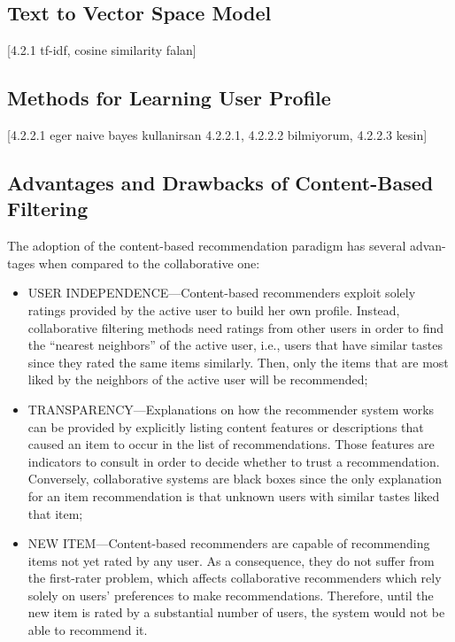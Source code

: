 \subsection{Text to Vector Space Model}

[4.2.1 tf-idf, cosine similarity falan]

\subsection{Methods for Learning User Profile}

[4.2.2.1 eger naive bayes kullanirsan 4.2.2.1, 4.2.2.2 bilmiyorum, 4.2.2.3 kesin]

\subsection{Advantages and Drawbacks of Content-Based Filtering}

The adoption of the content-based recommendation paradigm has several advan- tages when compared to the collaborative one:

\begin{itemize}
	\item USER INDEPENDENCE—Content-based recommenders exploit solely ratings provided by the active user to build her own profile. Instead, collaborative filtering methods need ratings from other users in order to find the “nearest neighbors” of the active user, i.e., users that have similar tastes since they rated the same items similarly. Then, only the items that are most liked by the neighbors of the active user will be recommended;
	\item TRANSPARENCY—Explanations on how the recommender system works can be provided by explicitly listing content features or descriptions that caused an item to occur in the list of recommendations. Those features are indicators to consult in order to decide whether to trust a recommendation. Conversely, collaborative systems are black boxes since the only explanation for an item recommendation is that unknown users with similar tastes liked that item;
	\item NEW ITEM—Content-based recommenders are capable of recommending items not yet rated by any user. As a consequence, they do not suffer from the first-rater problem, which affects collaborative recommenders which rely solely on users’ preferences to make recommendations. Therefore, until the new item is rated by a substantial number of users, the system would not be able to recommend it.
\end{itemize}

